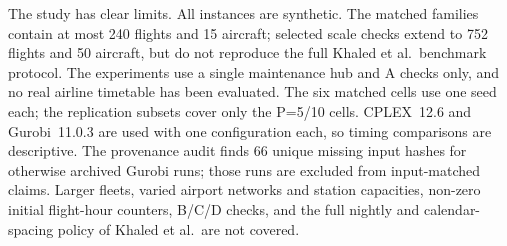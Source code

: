 The study has clear limits. All instances are synthetic. The matched families
contain at most 240 flights and 15 aircraft; selected scale checks extend to
752 flights and 50 aircraft, but do not reproduce the full Khaled et al.\
benchmark protocol. The experiments use a single maintenance hub and A checks
only, and no real airline timetable has been evaluated. The six
matched cells use one seed each; the replication subsets cover only the
P=5/10 cells. CPLEX~12.6 and Gurobi~11.0.3 are used with one configuration
each, so timing comparisons are descriptive. The provenance audit finds 66
unique missing input hashes for otherwise archived Gurobi runs; those runs are
excluded from input-matched claims. Larger fleets, varied airport
networks and station capacities, non-zero initial flight-hour counters, B/C/D
checks, and the full nightly and calendar-spacing policy of Khaled et al.\ are
not covered.

